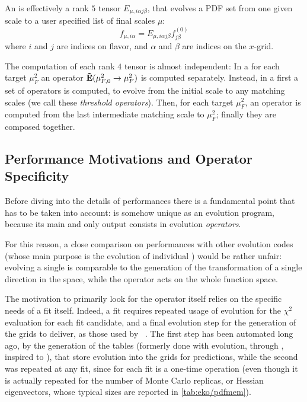 An \eko{} is effectively a rank $5$ tensor $E_{\mu,i \alpha j \beta}$, that
evolves a PDF set from one given scale to a user specified list of final scales
$\mu$:
\begin{equation}
    f_{\mu,i\alpha} = E_{\mu,i \alpha j \beta} f^{(0)}_{j \beta}
\end{equation}
where $i$ and $j$ are indices on flavor, and $\alpha$ and $\beta$ are indices on the $x$-grid.

The computation of each rank $4$ tensor is almost independent:
In a \ffns{} for each target $\mu_F^2$ an operator $\vb{\tilde E}(\mu_{F,0}^2 \to \mu_F^2)$ is computed separately.
Instead, in a \vfns{} first a set of operators is computed, to evolve from the
initial scale to any matching scales (we call these \textit{threshold
operators}). Then, for each target $\mu_F^2$, an operator is computed
from the last intermediate matching scale to $\mu_F^2$; finally
they are composed together.

\subsection{Performance Motivations and Operator Specificity}
\label{app:code:motiv}

Before diving into the details of \eko{} performances there is a fundamental
point that has to be taken into account: \eko{} is somehow unique as an
evolution program, because its main and only output consists in evolution
\textit{operators}.

For this reason, a close comparison on performances with other evolution codes
(whose main purpose is the evolution of individual \pdfs) would be rather
unfair: evolving a single \pdf{} is comparable to the generation of the
transformation of a single direction in the \pdf{} space, while the operator acts
on the whole function space.

The motivation to primarily look for the operator itself relies on the specific
needs of a \pdf{} fit itself.
Indeed, a fit requires repeated usage of evolution for the $\chi^2$ evaluation
for each fit candidate, and a final evolution step for the generation of the
\pdf{} grids to deliver, as those used by \lhapdf{}~\cite{Buckley:2014ana}.
The first step has been automated long ago, by the generation of the
\fk{} tables (formerly done with \apfel{} evolution, through
\href{https://github.com/NNPDF/apfelcomb}{\apfelcomb}, inspired to
\cite{Bertone:2016lga}), that store \pdf{} evolution into the grids for
predictions, while the second was repeated at any fit, since for each fit is a
one-time operation (even though it is actually repeated for the number of Monte
Carlo replicas, or Hessian eigenvectors, whose typical sizes are reported in
\cref{tab:eko/pdfmem}).

